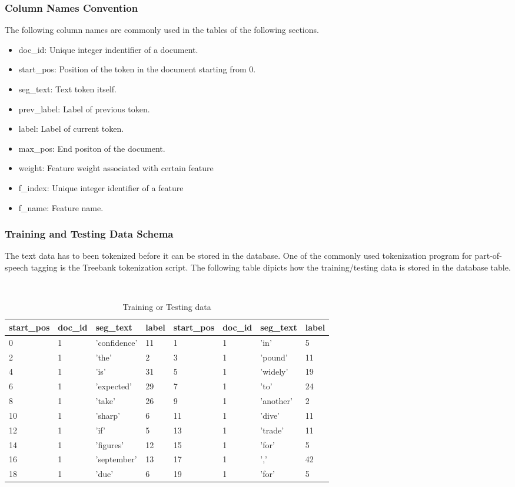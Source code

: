 \subsubsection{Column Names Convention}
The following column names are commonly used in the tables of the following sections.
\begin{itemize}
\item doc\_id: Unique integer indentifier of a document.
\item start\_pos: Position of the token in the document starting from 0.
\item seg\_text: Text token itself.
\item prev\_label: Label of previous token.
\item label: Label of current token.
\item max\_pos: End positon of the document.
\item weight: Feature weight associated with certain feature
\item f\_index: Unique integer identifier of a feature
\item f\_name: Feature name.
\end{itemize}

\subsubsection{Training and Testing Data Schema}
The text data has to been tokenized before it can be stored in the database. One of the commonly used tokenization program for part-of-speech
tagging is the Treebank tokenization script.
The following table dipicts how the training/testing data is stored in the database table.

\begin {table}[h]
\caption {Training or Testing data} \label{tab:trainingdata}
\begin{center}
    \footnotesize\tt
\begin{tabular}{llll||llll}
  start\_pos & doc\_id & seg\_text & label & start\_pos & doc\_id & seg\_text & label\\
  \hline
        0&1&'confidence'&11& 1&1&'in'&5\\
        2&1&'the'&2& 3&1&'pound'&11\\
        4&1&'is'&31& 5&1&'widely'&19\\
        6&1&'expected'&29& 7&1&'to'&24\\
        8&1&'take'&26& 9&1&'another'&2\\
        10&1&'sharp'&6& 11&1&'dive'&11\\
        12&1&'if'&5& 13&1&'trade'&11\\
        14&1&'figures'&12& 15&1&'for'&5\\
        16&1&'september'&13& 17&1&','&42\\
        18&1&'due'&6& 19&1&'for'&5\\\hline
\end{tabular}
\end{center}
\end{table}

